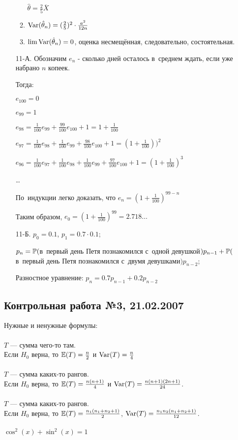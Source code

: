 \begin{enumerate}
\begin{enumerate}
$\hat{\theta}=\frac{2}{5}\overline{X}$
\item $\Var(\hat{\theta}_{n})=(\frac{2}{5})^{2}\cdot\frac{a^{2}}{12n}$
\item $\lim \Var(\hat{\theta}_{n})=0$, оценка несмещённая,
следовательно, состоятельная.
\end{enumerate}
\item[11-А.] Обозначим $e_{n}$ - сколько дней осталось в~среднем ждать, если
уже набрано $n$ копеек.

Тогда:

$e_{100}=0$

$e_{99}=1$

$e_{98}=\frac{1}{100}e_{99}+\frac{99}{100}e_{100}+1=1+\frac{1}{100}$

$e_{97}=\frac{1}{100}e_{98}+\frac{1}{100}e_{99}+\frac{98}{100}e_{100}+1=(1+\frac{1}{100}))^{2}$

$e_{96}=\frac{1}{100}e_{97}+\frac{1}{100}e_{98}+\frac{1}{100}e_{99}+\frac{97}{100}e_{100}+1=(1+\frac{1}{100})^{3}$

\ldots

По~индукции легко доказать, что $e_{n}=(1+\frac{1}{100})^{99-n}$

Таким образом, $e_{0}=(1+\frac{1}{100})^{99}=2.718 \ldots$

\item[11-Б.]  $p_{0}=0.1$, $p_{1}=0.7\cdot 0.1$;

$p_{n}=\P($в~первый день Петя познакомился с~одной
девушкой$)p_{n-1}+\P($в~первый день Петя познакомился с~двумя
девушками$)p_{n-2}$;

Разностное уравнение: $p_{n}=0.7p_{n-1}+0.2p_{n-2}$
\end{enumerate}

\subsection{Контрольная работа №3, 21.02.2007}

Нужные и ненужные формулы: \\ \\
$T$ — сумма чего-то там. \\
Если $H_{0}$ верна, то $\E(T)=\frac{n}{2}$ и $\Var(T)=\frac{n}{4}$ \\ \\
$T$ — сумма каких-то рангов. \\
Если $H_{0}$ верна, то $\E(T)=\frac{n(n+1)}{4}$ и
$\Var(T)=\frac{n(n+1)(2n+1)}{24}$. \\ \\
$T$ — сумма каких-то рангов. \\
Если $H_{0}$ верна, то $\E(T)=\frac{n_{1}(n_{1}+n_{2}+1)}{2}$,
$\Var(T)=\frac{n_{1}n_{2}(n_{1}+n_{2}+1)}{12}$. \\ \\
$\cos^{2}(x)+\sin^{2}(x)=1$ \\ 

